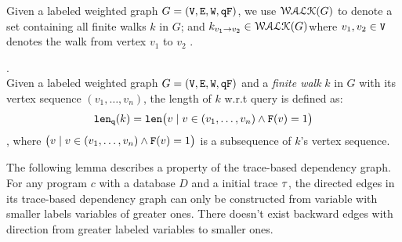 %
Given a labeled weighted graph $G = (\mathtt{V}, \mathtt{E}, \mathtt{W}, \mathtt{qF})$, 
we use $\mathcal{WALK}(G)$ to denote a set containing all finite walks $k$ in $G$;
and $k_{v_1 \to v_2} \in \mathcal{WALK}(G)$where $v_1, v_2 \in \mathtt{V}$ denotes the walk from vertex $v_1$ to $v_2$ .
%
%
\begin{defn}.
\label{def:qlen}
\\
Given a labeled weighted graph $G = (\mathtt{V}, \mathtt{E}, \mathtt{W}, \mathtt{qF})$ and a \emph{finite walk} $k$ in $G$ with its vertex sequence $(v_1, \ldots, v_{n})$, the length of $k$ w.r.t query is defined as:
\[
  \mathtt{len}_{\tt q}(k) = \mathtt{len}\big(
  v \mid v \in (v_1, \ldots, v_{n}) \land \mathtt{F}(v) = 1 \big)
\]
, where $\big(v \mid v \in (v_1, \ldots, v_{n}) \land \mathtt{F}(v) = 1 \big)$ is a subsequence of $k$'s vertex sequence.
\end{defn}
%
%
% 
%
The following lemma describes a property of the trace-based dependency graph.
For any program $c$ with a database $D$ and a initial trace $\mathtt{\tau}$,
the directed edges in its trace-based dependency graph can only be constructed from variable with  
smaller labels variables of greater ones.
There doesn't exist backward edges with direction from greater labeled variables to smaller ones.
%
%
%
